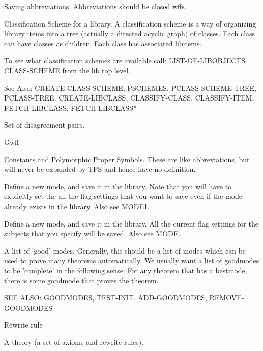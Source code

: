 \begin{description} 
\item[ABBR]  
Saving abbreviations. Abbreviations should be closed wffs. 

\item[CLASS-SCHEME]  
Classification Scheme for a library.
A classification scheme is a way of organizing library items into a tree 
(actually a directed acyclic graph) of classes.  Each class can have 
classes as children.  Each class has associated libitems.

To see what classification schemes are available call:
LIST-OF-LIBOBJECTS CLASS-SCHEME
from the lib top level.

See Also: CREATE-CLASS-SCHEME, PSCHEMES, PCLASS-SCHEME-TREE, 
PCLASS-TREE, CREATE-LIBCLASS, CLASSIFY-CLASS, CLASSIFY-ITEM, 
FETCH-LIBCLASS, FETCH-LIBCLASS*

\item[DPAIRSET]  
Set of disagreement pairs.

\item[GWFF]  
Gwff

\item[LIB-CONST]  
Constants and Polymorphic Proper Symbols. 
These are like abbreviations, but will never be expanded
by TPS and hence have no definition.

\item[MODE]  
Define a new mode, and save it in the library. Note that you will
    have to explicitly set the all the flag settings that you want to save
    even if the mode already exists in the library. Also see MODE1.

\item[MODE1]  
Define a new mode, and save it in the library. All the current flag
    settings for the subjects that you specify will be saved. Also see MODE.

\item[MODES-GWFFS]  
A list of 'good' modes.  Generally, this should be a list of
modes which can be used to prove many theorems automatically.
We usually want a list of goodmodes to be 'complete' in the following sense:
For any theorem that has a bestmode, there is some goodmode that proves the
theorem.

SEE ALSO: GOODMODES, TEST-INIT, ADD-GOODMODES, REMOVE-GOODMODES

\item[RRULE]  
Rewrite rule

\item[THEORY]  
A theory (a set of axioms and rewrite rules).
\item
\end{description}

